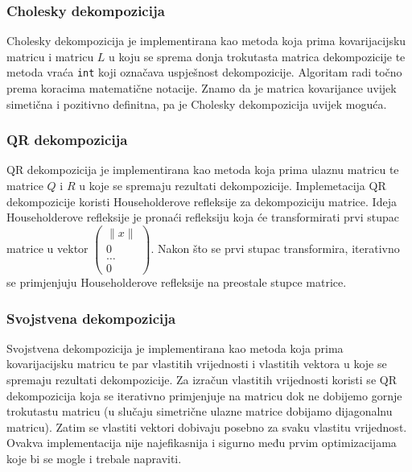 \documentclass[zavrsnirad]{fer}
\begin{document}
\subsubsection{Cholesky dekompozicija}
\label{sek:cholesky_dekompozicija}
Cholesky dekompozicija je implementirana
kao metoda koja prima kovarijacijsku matricu i matricu $L$ u koju se sprema
donja trokutasta matrica dekompozicije te metoda vraća \texttt{int} koji
označava uspješnost dekompozicije.
Algoritam radi točno prema koracima matematične notacije.
Znamo da je matrica kovarijance uvijek simetična i
pozitivno definitna, pa je Cholesky dekompozicija uvijek moguća.

\subsubsection{QR dekompozicija}
\label{sek:qr_dekompozicija}
QR dekompozicija je implementirana kao metoda koja prima ulaznu matricu
te matrice $Q$ i $R$ u koje se spremaju rezultati dekompozicije.
Implemetacija QR dekompozicije koristi Householderove refleksije za
dekompoziciju matrice. Ideja Householderove refleksije je pronaći
refleksiju koja će transformirati prvi stupac matrice u vektor
$\begin{pmatrix} \|x\| \\ 0 \\ \dots \\ 0 \end{pmatrix}$.
Nakon što se prvi stupac transformira, iterativno se primjenjuju
Householderove refleksije na preostale stupce matrice.


\subsubsection{Svojstvena dekompozicija}
\label{sek:svojstvena_dekompozicija}
Svojstvena dekompozicija je implementirana kao metoda koja prima
kovarijacijsku matricu te par vlastitih vrijednosti i vlastitih vektora u koje
se spremaju rezultati dekompozicije.
Za izračun vlastitih vrijednosti koristi se QR dekompozicija
koja se iterativno primjenjuje na matricu dok ne dobijemo
gornje trokutastu matricu (u slučaju simetrične ulazne matrice dobijamo
dijagonalnu matricu). Zatim se vlastiti vektori dobivaju
posebno za svaku vlastitu vrijednost. Ovakva implementacija nije
najefikasnija i sigurno među prvim optimizacijama koje bi se mogle
i trebale napraviti.
\end{document}
